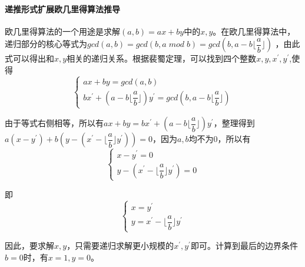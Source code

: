 \documentclass[UTF8,a4paper,10.5pt,twocolumn]{ctexart}
\begin{document}
\paragraph{递推形式扩展欧几里得算法推导}
	\indent \;
	\par 欧几里得算法的一个用途是求解$(a,b)=ax+by$中的$x,y$。在欧几里得算法中，递归部分的核心等式为$gcd(a,b)=gcd(b,a\; mod \; b)=gcd(b,a-b\lfloor \dfrac{a}{b}\rfloor)$ ，由此式可以得出和$x,y$相关的递归关系。根据裴蜀定理，可以找到四个整数$x,y,x^{\prime},y^{\prime}$,使得\\
	$$
		\left\{
			\begin{array}{lr}
			ax+by=gcd(a,b)\\
			bx^{\prime}+(a-b\lfloor\dfrac{a}{b}\rfloor)y^{\prime}=gcd(b,a-b\lfloor\dfrac{a}{b}\rfloor)
			\end{array}
		\right.
	$$
	\par 由于等式右侧相等，所以有$ax+by=bx^{\prime}+(a-b\lfloor\dfrac{a}{b}\rfloor)y^{\prime}$，整理得到$a(x-y^{\prime})+b(y-(x^{\prime}-\lfloor\dfrac{a}{b}\rfloor y^{\prime}))=0$，因为$a,b$均不为0，所以有\\
	$$
		\left\{
			\begin{array}{lr}
			x-y^{\prime}=0\\
			y-(x^{\prime}-\lfloor\dfrac{a}{b}\rfloor y^{\prime})=0
			\end{array}
		\right.
	$$
	\par 即\\

	$$
		\left\{
			\begin{array}{lr}
			x=y^{\prime}\\
			y=x^{\prime}-\lfloor\dfrac{a}{b}\rfloor y^{\prime}
			\end{array}
		\right.
	$$

	\par 因此，要求解$x,y$，只需要递归求解更小规模的$x^{\prime},y^{\prime}$即可。计算到最后的边界条件$b=0$时，有$x=1,y=0$。
\end{document}
